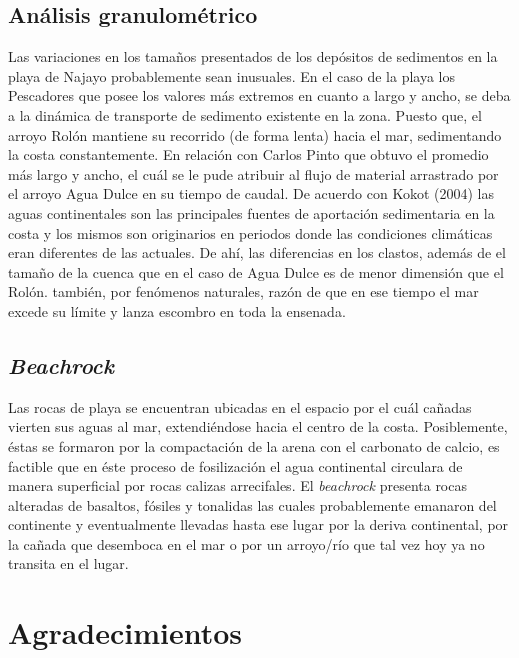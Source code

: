 \documentclass[11pt,]{article}
\begin{document}
\subsection{Análisis
granulométrico}\label{anuxe1lisis-granulomuxe9trico-1}

Las variaciones en los tamaños presentados de los depósitos de
sedimentos en la playa de Najayo probablemente sean inusuales. En el
caso de la playa los Pescadores que posee los valores más extremos en
cuanto a largo y ancho, se deba a la dinámica de transporte de sedimento
existente en la zona. Puesto que, el arroyo Rolón mantiene su recorrido
(de forma lenta) hacia el mar, sedimentando la costa constantemente. En
relación con Carlos Pinto que obtuvo el promedio más largo y ancho, el
cuál se le pude atribuir al flujo de material arrastrado por el arroyo
Agua Dulce en su tiempo de caudal. De acuerdo con Kokot (2004) las aguas
continentales son las principales fuentes de aportación sedimentaria en
la costa y los mismos son originarios en periodos donde las condiciones
climáticas eran diferentes de las actuales. De ahí, las diferencias en
los clastos, además de el tamaño de la cuenca que en el caso de Agua
Dulce es de menor dimensión que el Rolón. también, por fenómenos
naturales, razón de que en ese tiempo el mar excede su límite y lanza
escombro en toda la ensenada.

\subsection{\texorpdfstring{\emph{Beachrock}}{Beachrock}}\label{beachrock}

Las rocas de playa se encuentran ubicadas en el espacio por el cuál
cañadas vierten sus aguas al mar, extendiéndose hacia el centro de la
costa. Posiblemente, éstas se formaron por la compactación de la arena
con el carbonato de calcio, es factible que en éste proceso de
fosilización el agua continental circulara de manera superficial por
rocas calizas arrecifales. El \emph{beachrock} presenta rocas alteradas
de basaltos, fósiles y tonalidas las cuales probablemente emanaron del
continente y eventualmente llevadas hasta ese lugar por la deriva
continental, por la cañada que desemboca en el mar o por un arroyo/río
que tal vez hoy ya no transita en el lugar.

\section{Agradecimientos}\label{agradecimientos}
\end{document}
